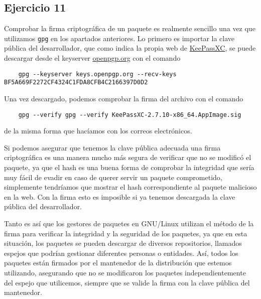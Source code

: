 \subsection{Ejercicio 11}

Comprobar la firma criptográfica de un paquete es realmente sencillo una vez que utilizamos \texttt{gpg} en los apartados anteriores. Lo primero es importar la clave pública del desarrollador, que como indica la propia web de \href{https://keepassxc.org/}{KeePassXC}, se puede descargar desde el keyserver \url{openpgp.org} con el comando

\begin{verbatim}
    gpg --keyserver keys.openpgp.org --recv-keys BF5A669F2272CF4324C1FDA8CFB4C2166397D0D2
\end{verbatim}

Una vez descargado, podemos comprobar la firma del archivo con el comando

\begin{verbatim}
    gpg --verify gpg --verify KeePassXC-2.7.10-x86_64.AppImage.sig
\end{verbatim}

de la misma forma que hacíamos con los correos electrónicos.

Si podemos asegurar que tenemos la clave pública adecuada una firma criptográfica es una manera mucho más segura de verificar que no se modificó el paquete, ya que el hash es una buena forma de comprobar la integridad que sería muy fácil de evadir en caso de querer servir un paquete comprometido, simplemente tendríamos que mostrar el hash correspondiente al paquete malicioso en la web. Con la firma esto es imposible si ya tenemos descargada la clave pública del desarrollador.

Tanto es así que los gestores de paquetes en GNU/Linux utilizan el método de la firma para verificar la integridad y la seguridad de los paquetes, ya que en esta situación, los paquetes se pueden descargar de diversos repositorios, llamados espejos que podrían gestionar diferentes personas o entidades. Así, todos los paquetes están firmados por el mantenedor de la distribución que estemos utilizando, asegurando que no se modificaron los paquetes independientemente del espejo que utilicemos, siempre que se valide la firma con la clave pública del mantenedor.